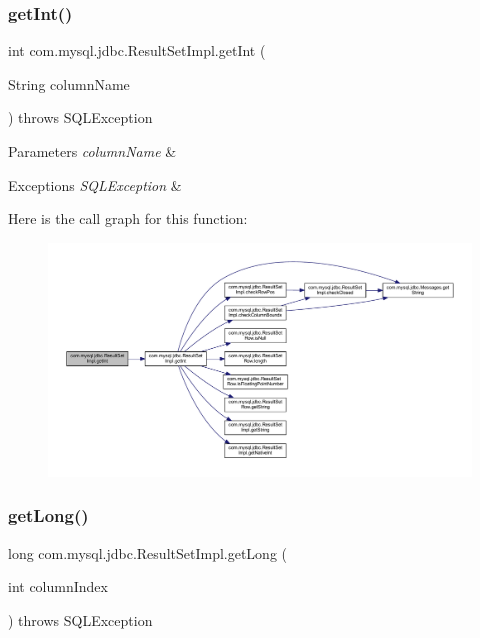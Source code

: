 \subsubsection{\texorpdfstring{get\+Int()}{getInt()}\hspace{0.1cm}{\footnotesize\ttfamily [2/2]}}
{\footnotesize\ttfamily int com.\+mysql.\+jdbc.\+Result\+Set\+Impl.\+get\+Int (\begin{DoxyParamCaption}\item[{String}]{column\+Name }\end{DoxyParamCaption}) throws S\+Q\+L\+Exception}


\begin{DoxyParams}{Parameters}
{\em column\+Name} & \\
\hline
\end{DoxyParams}

\begin{DoxyExceptions}{Exceptions}
{\em S\+Q\+L\+Exception} & \\
\hline
\end{DoxyExceptions}
Here is the call graph for this function\+:
\nopagebreak
\begin{figure}[H]
\begin{center}
\leavevmode
\includegraphics[width=350pt]{classcom_1_1mysql_1_1jdbc_1_1_result_set_impl_a3c2086aa55638f2572fc804f6a5cc3b9_cgraph}
\end{center}
\end{figure}
\mbox{\label{classcom_1_1mysql_1_1jdbc_1_1_result_set_impl_a5bc3a43633fc4301e35603a9516712c3}} 
\subsubsection{\texorpdfstring{get\+Long()}{getLong()}\hspace{0.1cm}{\footnotesize\ttfamily [1/2]}}
{\footnotesize\ttfamily long com.\+mysql.\+jdbc.\+Result\+Set\+Impl.\+get\+Long (\begin{DoxyParamCaption}\item[{int}]{column\+Index }\end{DoxyParamCaption}) throws S\+Q\+L\+Exception}

